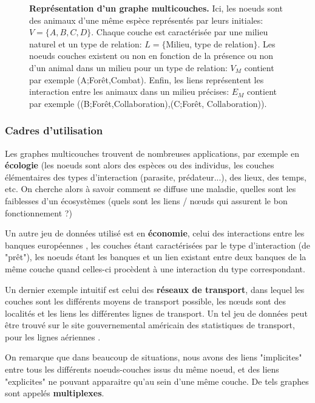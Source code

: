 \documentclass[11pt,a4paper]{article}
\theoremstyle{definition}
\theoremstyle{remark}
\theoremstyle{remark}
\begin{document}
\begin{figure}[h]
	\centering
	
	\caption{\textbf{Représentation d'un graphe multicouches.} Ici, les noeuds sont des animaux d'une même espèce représentés par leurs initiales: $V = \{A ,B,C,D \}$. Chaque couche est caractérisée par une milieu naturel et un type de relation: $L = \{$Milieu, type de relation$\}$. Les noeuds couches existent ou non en fonction de la présence ou non d'un animal dans un milieu pour un type de relation: $V_M$ contient par exemple (A;Forêt,Combat). Enfin, les liens représentent les interaction entre les animaux dans un milieu précises: $E_M$ contient par exemple ((B;Forêt,Collaboration),(C;Forêt, Collaboration)).}
	\label{exmulti}
\end{figure}

\subsubsection{Cadres d'utilisation}


Les graphes multicouches trouvent de nombreuses applications, par exemple en \textbf{écologie} \cite{ecolo} (les noeuds sont alors des espèces ou des individus, les couches élémentaires des types d'interaction (parasite, prédateur...), des lieux, des temps, etc. On cherche alors à savoir comment se diffuse une maladie, quelles sont les faiblesses d'un écosystèmes (quels sont les liens / nœuds qui assurent le bon fonctionnement ?)

Un autre jeu de données utilisé est en \textbf{économie}, celui des interactions entre les banques européennes \cite{interbank}, les couches étant caractérisées par le type d'interaction (de "prêt"), les noeuds étant les banques et un lien existant entre deux banques de la même couche quand celles-ci procèdent à une interaction du type correspondant.

Un dernier exemple intuitif est celui des \textbf{réseaux de transport}, dans lequel les couches sont les différents moyens de transport possible, les nœuds sont des localités et les liens les différentes lignes de transport. Un tel jeu de données peut être trouvé sur le site gouvernemental américain des statistiques de transport, pour les lignes aériennes \cite{plane}.

On remarque que dans beaucoup de situations, nous avons des liens "implicites" entre tous les différents noeuds-couches issus du même noeud, et des liens "explicites" ne pouvant apparaitre qu'au sein d'une même couche. De tels graphes sont appelés \textbf{multiplexes}.
\end{document}
